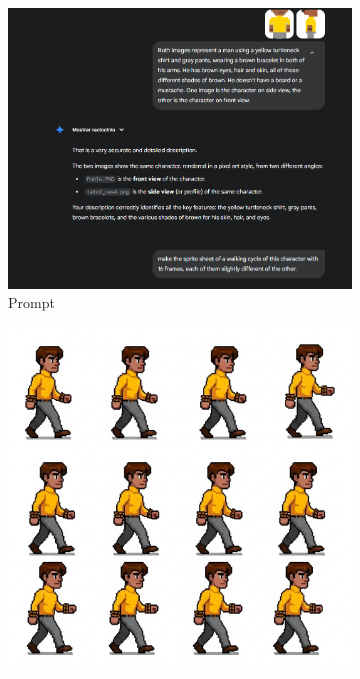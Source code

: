 \begin{figure}[htbp]
    \centering
    \caption{\small Processo da geração 1 do sprite sheet no Gemini Pro em julho/2025}
    \label{fig:geminiProSheet1}

    \begin{subfigure}{0.7\linewidth}
        \includegraphics[width=1\linewidth]{figs/geminiPro/chat8/tela1_novo.PNG}
        \caption{\small Prompt}
        \label{fig:geminiProSheet1Prompt}
    \end{subfigure}
    \begin{subfigure}{0.3\linewidth}
        \includegraphics[width=1\linewidth]{figs/geminiPro/chat8/tela1_res1.PNG}

\end{subfigure}
\end{figure}
